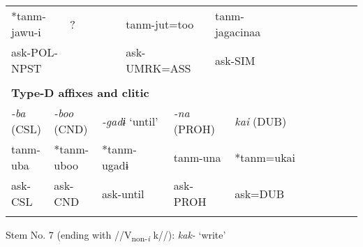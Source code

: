 \begin{tabularx}{\textwidth}{XXXXXXXXXXXXXXXXXXXXX}
\multicolumn{4}{X}{{ *tanm-jawu-i}} & \multicolumn{3}{X}{{ ?}} & \multicolumn{3}{X}{tanm-jut=too} & \multicolumn{4}{X}{{ tanm-jagacinaa}} & \multicolumn{7}{X}{}\\
\multicolumn{4}{X}{ask-POL-NPST} & \multicolumn{3}{X}{} & \multicolumn{3}{X}{ask-UMRK=ASS} & \multicolumn{4}{X}{ask-SIM} & \multicolumn{7}{X}{}\\
\multicolumn{21}{X}{}\\
\multicolumn{21}{X}{{\bfseries Type-D affixes and clitic}}\\
\multicolumn{3}{X}{{ \textit{{}-ba} (CSL)}} & \multicolumn{3}{X}{{ \textit{{}-boo} (CND)}} & \multicolumn{2}{X}{{ \textit{{}-gadɨ} ‘until’}} & \multicolumn{3}{X}{{ \textit{{}-na} (PROH)}} & \multicolumn{5}{X}{{ \textit{kai} (DUB)}} & \multicolumn{5}{X}{}\\
\multicolumn{3}{X}{{ tanm-uba}} & \multicolumn{3}{X}{{ *tanm-uboo}} & \multicolumn{2}{X}{{ *tanm-ugadɨ}} & \multicolumn{3}{X}{{ tanm-una}} & \multicolumn{5}{X}{{ *tanm=ukai}} & \multicolumn{5}{X}{}\\
\multicolumn{3}{X}{ask-CSL} & \multicolumn{3}{X}{ask-CND} & \multicolumn{2}{X}{ask-until} & \multicolumn{3}{X}{ask-PROH} & \multicolumn{5}{X}{ask=DUB} & \multicolumn{5}{X}{}\\
\lspbottomrule
\end{tabularx}
Stem No. 7 (ending with //V\textsubscript{non-}\textit{\textsubscript{i} }k//): \textit{kak-} ‘write’

\tablefirsthead{}

